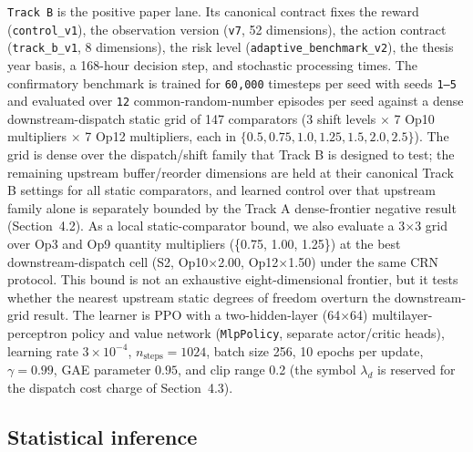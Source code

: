 \texttt{Track\ B} is the positive paper lane. Its canonical contract fixes
the reward (\texttt{control\_v1}), the observation version (\texttt{v7},
52 dimensions), the action contract (\texttt{track\_b\_v1}, 8 dimensions),
the risk level (\texttt{adaptive\_benchmark\_v2}), the thesis year basis,
a 168-hour decision step, and stochastic processing times. The confirmatory benchmark is trained for
\texttt{60{,}000} timesteps per seed with seeds \texttt{1--5} and
evaluated over \texttt{12} common-random-number episodes per seed against
a dense downstream-dispatch static grid of 147 comparators (3 shift
levels $\times$
7 Op10 multipliers $\times$ 7 Op12 multipliers, each in $\{0.5, 0.75,
1.0, 1.25, 1.5, 2.0, 2.5\}$). The grid is dense over the dispatch/shift
family that Track B is designed to test; the remaining upstream
buffer/reorder dimensions are held at their canonical Track B settings
for all static comparators, and learned control over that upstream family
alone is separately bounded by the Track A dense-frontier negative result
(Section~4.2). As a local static-comparator bound, we also evaluate a
3$\times$3 grid over Op3 and Op9 quantity multipliers
(\{0.75, 1.00, 1.25\}) at the best downstream-dispatch cell
(S2, Op10$\times$2.00, Op12$\times$1.50) under the same CRN protocol.
This bound is not an exhaustive eight-dimensional frontier, but it tests
whether the nearest upstream static degrees of freedom overturn the
downstream-grid result.
The learner is PPO with a two-hidden-layer
(64$\times$64) multilayer-perceptron policy and value network
(\texttt{MlpPolicy}, separate actor/critic heads), learning rate
$3\times10^{-4}$, $n_{\mathrm{steps}}{=}1024$, batch size 256, 10 epochs
per update, $\gamma{=}0.99$, GAE parameter $0.95$, and clip range 0.2 (the symbol $\lambda_d$ is reserved for the dispatch cost charge of Section~4.3).

\subsection{Statistical inference}\label{35-statistical-inference}


